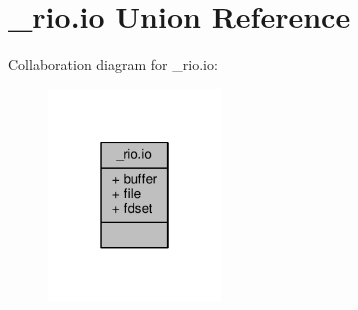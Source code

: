 \hypertarget{union__rio_8io}{}\section{\+\_\+rio.\+io Union Reference}
\label{union__rio_8io}


Collaboration diagram for \+\_\+rio.\+io\+:\nopagebreak
\begin{figure}[H]
\begin{center}
\leavevmode
\includegraphics[width=130pt]{union__rio_8io__coll__graph}
\end{center}
\end{figure}
